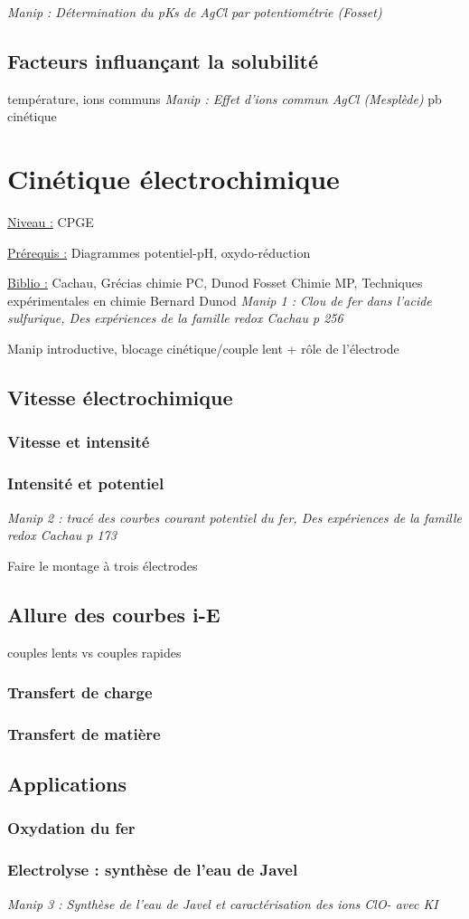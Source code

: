 \documentclass{article}%
\begin{document}
\textit{Manip : Détermination du pKs de AgCl par potentiométrie (Fosset)}
\subsection{Facteurs influançant la solubilité}
température, ions communs
\textit{Manip : Effet d’ions commun AgCl (Mesplède)}
pb cinétique

\section{Cinétique électrochimique}
\underline{Niveau :} CPGE 

\underline{Prérequis :} Diagrammes potentiel-pH, oxydo-réduction

\underline{Biblio :} Cachau, Grécias chimie PC, Dunod Fosset Chimie MP, Techniques expérimentales en chimie Bernard Dunod
\textit{Manip 1 : Clou de fer dans l'acide sulfurique, Des expériences de la famille redox Cachau p 256}

Manip introductive, blocage cinétique/couple lent + rôle de l'électrode
\subsection{Vitesse électrochimique}
\subsubsection{Vitesse et intensité}
\subsubsection{Intensité et potentiel}
\textit{Manip 2 : tracé des courbes courant potentiel du fer, Des expériences de la famille redox Cachau p 173}

Faire le montage à trois électrodes
\subsection{Allure des courbes i-E}

couples lents vs couples rapides
\subsubsection{Transfert de charge}
\subsubsection{Transfert de matière}
\subsection{Applications}
\subsubsection{Oxydation du fer}
\subsubsection{Electrolyse : synthèse de l'eau de  Javel}
\textit{Manip 3 : Synthèse de l'eau de Javel et caractérisation des ions ClO- avec KI}
\end{document}
